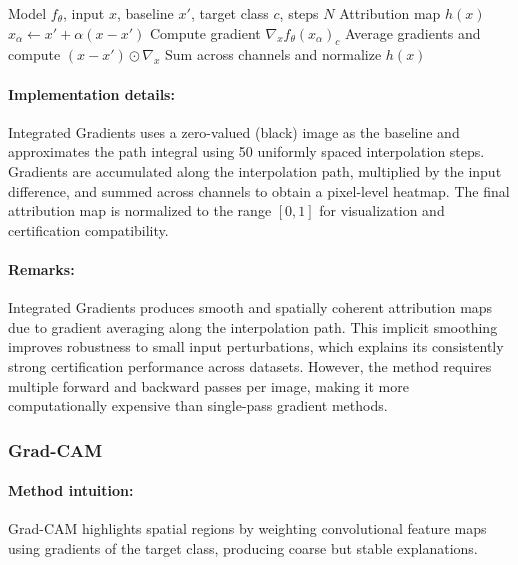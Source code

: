 \documentclass[11pt]{article}
\begin{document}
\begin{algorithm}[H]
\caption{Integrated Gradients (IG)}
\label{alg:ig}
\begin{algorithmic}[1]
\REQUIRE Model $f_\theta$, input $x$, baseline $x'$, target class $c$, steps $N$
\ENSURE Attribution map $h(x)$
    \STATE $x_\alpha \leftarrow x' + \alpha (x - x')$
    \STATE Compute gradient $\nabla_x f_\theta(x_\alpha)_c$
\ENDFOR
\STATE Average gradients and compute $(x - x') \odot \nabla_x$
\STATE Sum across channels and normalize
\RETURN $h(x)$
\end{algorithmic}
\end{algorithm}

\paragraph{Implementation details:}
Integrated Gradients uses a zero-valued (black) image as the baseline and approximates the path integral using 50 uniformly spaced interpolation steps. Gradients are accumulated along the interpolation path, multiplied by the input difference, and summed across channels to obtain a pixel-level heatmap. The final attribution map is normalized to the range $[0,1]$ for visualization and certification compatibility.

\paragraph{Remarks:}
Integrated Gradients produces smooth and spatially coherent attribution maps due to gradient averaging along the interpolation path. This implicit smoothing improves robustness to small input perturbations, which explains its consistently strong certification performance across datasets. However, the method requires multiple forward and backward passes per image, making it more computationally expensive than single-pass gradient methods.

\subsubsection{Grad-CAM}

\paragraph{Method intuition:}
Grad-CAM highlights spatial regions by weighting convolutional feature maps using gradients of the target class, producing coarse but stable explanations.
\end{document}
